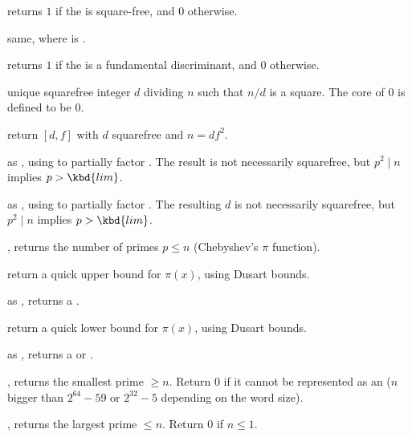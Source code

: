 
 returns $1$ if the  
is square-free, and $0$ otherwise.

 same, where  is
.

 returns $1$ if the  
is a fundamental discriminant, and $0$ otherwise.

 unique squarefree integer $d$ dividing $n$ such that
$n/d$ is a square. The core of $0$ is defined to be $0$.

 return $[d,f]$ with $d$ squarefree and $n = df^2$.

 as , using
 to partially factor . The result is not
necessarily squarefree, but $p^2 \mid n$ implies $p > \kbd{lim}$.

 as , using
 to partially factor . The resulting $d$ is not
necessarily squarefree, but $p^2 \mid n$ implies $p > \kbd{lim}$.



, returns the number of primes $p\leq n$
(Chebyshev's $\pi$ function).

 return a quick upper bound for
$\pi(x)$, using Dusart bounds.

 as , returns a
.

 return a quick lower bound for
$\pi(x)$, using Dusart bounds.

 as , returns
a  or .


, returns the smallest prime $\geq n$. Return
$0$ if it cannot be represented as an  ($n$ bigger than $2^{64} -
59$ or $2^{32} - 5$ depending on the word size).

, returns the largest prime $\leq n$. Return
$0$ if $n\leq 1$.

